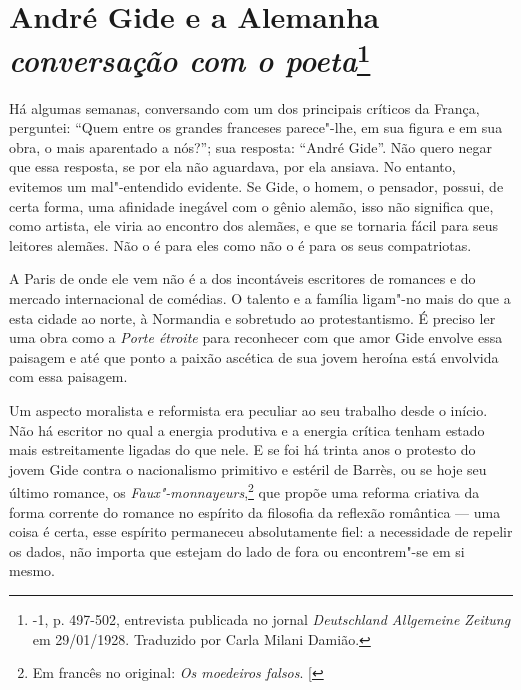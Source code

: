 \chapter*{André Gide e a Alemanha\\
\emph{conversação com o poeta}\footnote[*]{-1,
  p. 497-502, entrevista publicada no jornal \emph{Deutschland
  Allgemeine Zeitung} em 29/01/1928. Traduzido por Carla Milani Damião.}}


Há algumas semanas, conversando com um dos principais críticos da
França, perguntei: ``Quem entre os grandes franceses parece"-lhe, em sua
figura e em sua obra, o mais aparentado a nós?''; sua resposta:
``André Gide''. Não quero negar que essa resposta, se por ela não
aguardava, por ela ansiava. No entanto, evitemos um mal"-entendido
evidente. Se Gide, o homem, o pensador, possui, de certa forma, uma
afinidade inegável com o gênio alemão, isso não significa que, como
artista, ele viria ao encontro dos alemães, e que se tornaria fácil para
seus leitores alemães. Não o é para eles como não o é para os seus
compatriotas.

A Paris de onde ele vem não é a dos incontáveis ​​escritores de romances
e do mercado internacional de comédias. O talento e a família ligam"-no
mais do que a esta cidade ao norte, à Normandia e sobretudo ao
protestantismo. É preciso ler uma obra como a \emph{Porte étroite} para
reconhecer com que amor Gide envolve essa paisagem e até que ponto a
paixão ascética de sua jovem heroína está envolvida com essa paisagem.

Um aspecto moralista e reformista era peculiar ao seu trabalho desde o
início. Não há escritor no qual a energia produtiva e a energia crítica
tenham estado mais estreitamente ligadas do que nele. E se foi há trinta
anos o protesto do jovem Gide contra o nacionalismo primitivo e estéril
de Barrès, ou se hoje seu último romance, os \emph{Faux"-monnayeurs},\footnote{Em francês no original: \emph{Os moedeiros falsos}. {[}\versal{N. T.}{]}}
que propõe uma reforma criativa da forma corrente do romance no
espírito da filosofia da reflexão romântica --- uma coisa é certa, esse
espírito permaneceu absolutamente fiel: a necessidade de repelir os
dados, não importa que estejam do lado de fora ou encontrem"-se em si
mesmo.

